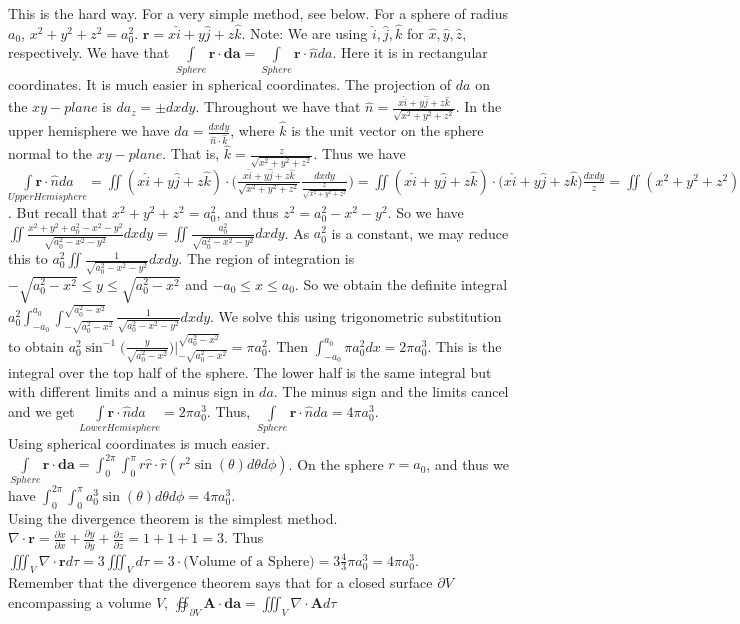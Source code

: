 \documentclass[oneside]{book}
\theoremstyle{definition}
\newcommand*\B[1]{\mathbf{#1}}
\begin{document}
This is the hard way. For a very simple method, see below.
For a sphere of radius $a_0$, $x^2+y^2+z^2 = a_0^2$. $\B{r} = x\hat{i}+y\hat{j}+z\hat{k}$. Note: We are using $\hat{i},\hat{j},\hat{k}$ for $\hat{x},\hat{y},\hat{z}$, respectively. We have that $\underset{Sphere}\int \B{r}\cdot \B{da} = \underset{Sphere}\int\B{r}\cdot \hat{n}da$. Here it is in rectangular coordinates. It is much easier in spherical coordinates. The projection of $da$ on the $xy-plane$ is $da_z= \pm dxdy$. Throughout we have that $\hat{n} = \frac{x\hat{i}+y\hat{j}+z\hat{k}}{\sqrt{x^2+y^2+z^2}}$. In the upper hemisphere we have $da= \frac{dx dy}{\hat{n}\cdot \hat{k}}$, where $\hat{k}$ is the unit vector on the sphere normal to the $xy-plane$. That is, $\hat{k} = \frac{z}{\sqrt{x^2+y^2+z^2}}$. Thus we have $\underset{Upper Hemisphere}{\int \B{r}\cdot \hat{n} da} = \iint(x\hat{i}+y\hat{j}+z\hat{k})\cdot\big(\frac{x\hat{i}+y\hat{j}+z\hat{k}}{\sqrt{x^2+y^2+z^2}}\frac{dxdy}{\frac{z}{\sqrt{x^2+y^2+z^2}}}\big)=\iint (x\hat{i}+y\hat{j}+z\hat{k})\cdot (x\hat{i}+y\hat{j}+z\hat{k}\big)\frac{dxdy}{z}=\iint(x^2+y^2+z^2)\frac{dxdy}{z}$. But recall that $x^2+y^2+z^2=a_0^2$, and thus $z^2 = a_0^2 - x^2 - y^2$. So we have $\iint \frac{x^2+y^2+a_0^2-x^2-y^2}{\sqrt{a_0^2-x^2-y^2}}dxdy = \iint \frac{a_0^2}{\sqrt{a_0^2-x^2-y^2}}dxdy$. As $a_0^2$ is a constant, we may reduce this to $a_0^2\iint \frac{1}{\sqrt{a_0^2-x^2-y^2}}dxdy$. The region of integration is $-\sqrt{a_0^2-x^2}\leq y \leq \sqrt{a_0^2-x^2}$ and $-a_0\leq x \leq a_0$. So we obtain the definite integral $a_0^2 \int_{-a_0}^{a_0}\int_{-\sqrt{a_0^2-x^2}}^{\sqrt{a_0^2-x^2}} \frac{1}{\sqrt{a_0^2-x^2-y^2}}dxdy$. We solve this using trigonometric substitution to obtain $a_0^2 \sin^{-1}\big(\frac{y}{\sqrt{a_0^2-x^2}}\big)\bigg|_{-\sqrt{a_0^2-x^2}}^{\sqrt{a_0^2-x^2}} = \pi a_0^2$. Then $\int_{-a_0}^{a_0} \pi a_0^2 dx = 2\pi a_0^3$. This is the integral over the top half of the sphere. The lower half is the same integral but with different limits and a minus sign in $da$. The minus sign and the limits cancel and we get $\underset{Lower Hemisphere}{\int \B{r}\cdot \hat{n}da} = 2\pi a_0^3$. Thus, $\underset{Sphere}\int \B{r}\cdot \hat{n}da = 4\pi a_0^3$. \\ 
Using spherical coordinates is much easier. $\underset{Sphere}\int \B{r}\cdot \B{da} = \int_{0}^{2\pi}\int_{0}^{\pi} r\hat{r}\cdot \hat{r}(r^2 \sin(\theta) d\theta d\phi)$. On the sphere $r = a_0$, and thus we have $\int_{0}^{2\pi}\int_{0}^{\pi} a_0^3 \sin(\theta)d\theta d\phi = 4 \pi a_0^3$.\\
Using the divergence theorem is the simplest method.
$\nabla \cdot \B{r} = \frac{\partial x}{\partial x} + \frac{\partial y}{\partial y} + \frac{\partial z}{\partial z} = 1+1+1=3$. Thus $\iiint_V \nabla \cdot \B{r} d\tau = 3\iiint_V d\tau = 3\cdot(\textrm{Volume of a Sphere)} = 3 \frac{4}{3}\pi a_0^3=4\pi a_0^3$.\\
Remember that the divergence theorem says that for a closed surface $\partial V$ encompassing a volume $V$, $\oiint_{\partial V} \B{A}\cdot\B{da} = \iiint_{V} \nabla\cdot \B{A} d\tau$
\end{document}
